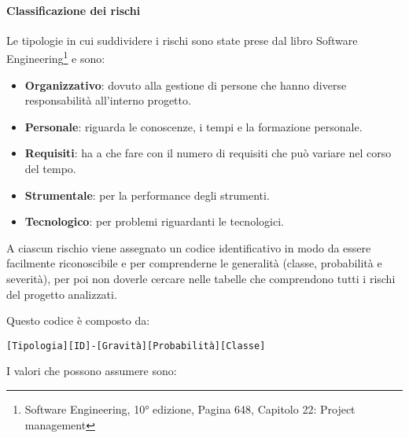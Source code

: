 			\paragraph{Classificazione dei rischi}
			Le tipologie in cui suddividere i rischi sono state prese dal libro Software Engineering\footnote{Software Engineering, 10° edizione, Pagina 648, Capitolo 22: Project management} e sono:
			\begin{itemize}
				\item \textbf{Organizzativo}: dovuto alla gestione di persone che hanno diverse responsabilità all'interno progetto.
				\item \textbf{Personale}: riguarda le conoscenze, i tempi e la formazione personale.
				\item \textbf{Requisiti}: ha a che fare con il numero di requisiti che può variare nel corso del tempo.
				\item \textbf{Strumentale}: per la performance degli strumenti.
				\item \textbf{Tecnologico}: per problemi riguardanti le tecnologici.
			\end{itemize}
			
			A ciascun rischio viene assegnato un codice identificativo in modo da essere facilmente riconoscibile e per comprenderne le generalità (classe, probabilità e severità), per poi non doverle cercare nelle tabelle che comprendono tutti i rischi del progetto analizzati.
			
			Questo codice è composto da:
			
			\begin{center}
				\texttt{[Tipologia][ID]-[Gravità][Probabilità][Classe]}
			\end{center}
			
			I valori che possono assumere sono:
			
